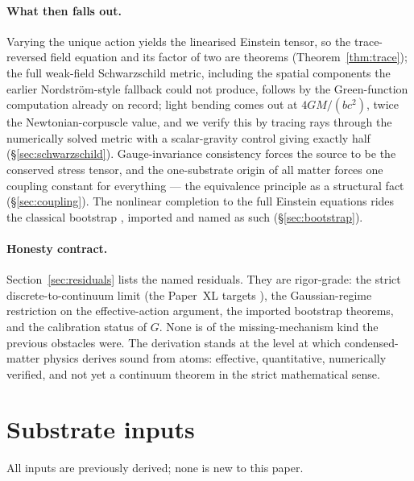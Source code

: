 \documentclass[12pt]{article}
\theoremstyle{definition}
\theoremstyle{remark}
\begin{document}
\paragraph{What then falls out.} Varying the unique action yields the linearised Einstein tensor, so the trace-reversed field equation and its factor of two are theorems (Theorem~\ref{thm:trace}); the full weak-field Schwarzschild metric, including the spatial components the earlier Nordstr\"om-style fallback could not produce, follows by the Green-function computation already on record; light bending comes out at $4GM/(bc^2)$, twice the Newtonian-corpuscle value, and we verify this by tracing rays through the numerically solved metric with a scalar-gravity control giving exactly half (\S\ref{sec:schwarzschild}). Gauge-invariance consistency forces the source to be the conserved stress tensor, and the one-substrate origin of all matter forces one coupling constant for everything --- the equivalence principle as a structural fact (\S\ref{sec:coupling}). The nonlinear completion to the full Einstein equations rides the classical bootstrap \citep{Gupta1954, Kraichnan1955, Feynman1995, Deser1970, BoulwareDeser1975, Wald1986}, imported and named as such (\S\ref{sec:bootstrap}).

\paragraph{Honesty contract.} Section~\ref{sec:residuals} lists the named residuals. They are rigor-grade: the strict discrete-to-continuum limit (the Paper~XL targets \citep{SmartXL}), the Gaussian-regime restriction on the effective-action argument, the imported bootstrap theorems, and the calibration status of $G$. None is of the missing-mechanism kind the previous obstacles were. The derivation stands at the level at which condensed-matter physics derives sound from atoms: effective, quantitative, numerically verified, and not yet a continuum theorem in the strict mathematical sense.

\section{Substrate inputs}\label{sec:inputs}

All inputs are previously derived; none is new to this paper.
\end{document}
